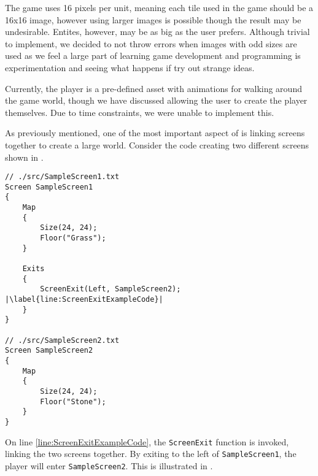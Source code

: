 

The game uses 16 pixels per unit, meaning each tile used in the game should be a 16x16 image, however using larger images is possible though the result may be undesirable. Entites, however, may be as big as the user prefers. 
Although trivial to implement, we decided to not throw errors when images with odd sizes are used as we feel a large part of learning game development and programming is experimentation and seeing what happens if try out strange ideas.



Currently, the player is a pre-defined asset with animations for walking around the game world, though we have discussed allowing the user to create the player themselves. Due to time constraints, we were unable to implement this. 


As previously mentioned, one of the most important aspect of \dazel{} is linking screens together to create a large world. Consider the code creating two different screens shown in .

\begin{lstlisting}[language=CSharp, caption={}, label={lst:DazelScreenExit},escapechar=|]
// ./src/SampleScreen1.txt
Screen SampleScreen1 
{
	Map 
	{
		Size(24, 24);
		Floor("Grass");
	}

	Exits
	{
		ScreenExit(Left, SampleScreen2); |\label{line:ScreenExitExampleCode}|
	}
}

// ./src/SampleScreen2.txt
Screen SampleScreen2
{
	Map 
	{
		Size(24, 24);
		Floor("Stone");
	}
}
\end{lstlisting}

On line \ref{line:ScreenExitExampleCode}, the \texttt{ScreenExit} function is invoked, linking the two screens together.
By exiting to the left of \texttt{SampleScreen1}, the player will enter \texttt{SampleScreen2}.
This is illustrated in .



